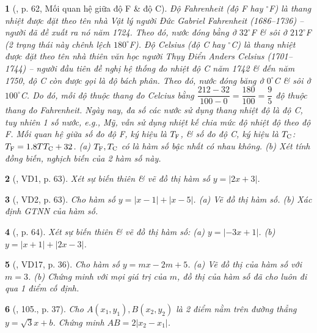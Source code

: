 \documentclass{article}
\newtheorem{baitoan}{}
\begin{document}
\begin{baitoan}[\cite{Binh_boi_duong_Toan_9_tap_1}, p. 62, Mối quan hệ giữa độ F \& độ C]
	Độ Fahrenheit (độ {\rm F} hay ${}^\circ${\rm F}) là thang nhiệt được đặt theo tên nhà Vật lý người Đức Gabriel Fahrenheit (1686--1736) -- người đã đề xuất ra nó năm 1724. Theo đó, nước đóng bằng ở $32^\circ${\rm F} \& sôi ở $212^\circ${\rm F} (2 trạng thái này chênh lệch $180^\circ${\rm F}). Độ Celsius (độ {\rm C} hay ${}^\circ${\rm C}) là thang nhiệt được đặt theo tên nhà thiên văn học người Thụy Điển Anders Celsius (1701--1744) -- người đầu tiên đề nghị hệ thống đo nhiệt độ {\rm C} năm 1742 \& đến năm 1750, độ {\rm C} còn được gọi là độ bách phân. Theo đó, nước đóng băng ở $0^\circ${\rm C} \& sôi ở $100^\circ${\rm C}. Do đó, mỗi độ thuộc thang đo Celcius bằng $\dfrac{212 - 32}{100 - 0} = \dfrac{180}{100} = \dfrac{9}{5}$ độ thuộc thang đo Fahrenheit. Ngày nay, đa số các nước sử dụng thang nhiệt độ là độ {\rm C}, tuy nhiên 1 số nước, e.g., Mỹ, vẫn sử dụng nhiệt kế chia mức độ nhiệt độ theo độ {\rm F}. Mối quan hệ giữa số đo độ {\rm F}, ký hiệu là $T_{\rm F}$, \& số đo độ {\rm C}, ký hiệu là $T_{\rm C}$: $T_{\rm F} = 1.8TT_{\rm C} + 32$. (a) $T_{\rm F},T_{\rm C}$ có là hàm số bậc nhất có nhau không. (b) Xét tính đồng biến, nghịch biến của 2 hàm số này.
\end{baitoan}

\begin{baitoan}[\cite{Binh_boi_duong_Toan_9_tap_1}, VD1, p. 63]
	Xét sự biến thiên \& vẽ đồ thị hàm số $y = |2x + 3|$.
\end{baitoan}

\begin{baitoan}[\cite{Binh_boi_duong_Toan_9_tap_1}, VD2, p. 63]
	Cho hàm số $y = |x - 1| + |x - 5|$. (a) Vẽ đồ thị hàm số. (b) Xác định {\rm GTNN} của hàm số.
\end{baitoan}

\begin{baitoan}[\cite{Binh_boi_duong_Toan_9_tap_1}, p. 64]
	Xét sự biến thiên \& vẽ đồ thị hàm số: (a) $y = |-3x + 1|$. (b) $y = |x + 1| + |2x - 3|$.
\end{baitoan}

\begin{baitoan}[\cite{Tuyen_Toan_9_old}, VD17, p. 36]
	Cho hàm số $y = mx - 2m + 5$. (a) Vẽ đồ thị của hàm số với $m = 3$. (b) Chứng minh với mọi giá trị của $m$, đồ thị của hàm số đã cho luôn đi qua 1 điểm cố định.
\end{baitoan}

\begin{baitoan}[\cite{Tuyen_Toan_9_old}, 105., p. 37]
	Cho $A(x_1,y_1),B(x_2,y_2)$ là 2 điểm nằm trên đường thẳng $y = \sqrt{3}x + b$. Chứng minh $AB = 2|x_2 - x_1|$.
\end{baitoan}
\end{document}
